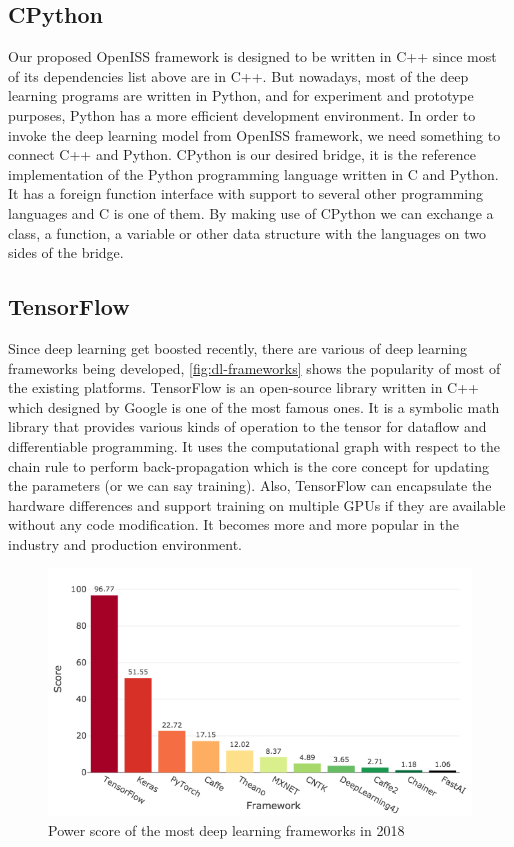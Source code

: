 \subsection{CPython}
\label{sec:related_work_cpython}

Our proposed OpenISS framework is designed to be written in C++ since most of
its dependencies list above are in C++. But nowadays, most of the deep learning
programs are written in Python, and for experiment and prototype purposes,
Python has a more efficient development environment. In order to invoke the
deep learning model from OpenISS framework, we need something to connect C++
and Python. CPython is our desired bridge, it is the reference implementation
of the Python programming language written in C and Python. It has a foreign
function interface with support to several other programming languages and C is
one of them. By making use of CPython we can exchange a class, a function, a
variable or other data structure with the languages on two sides of the bridge.

\subsection{TensorFlow}
\label{sec:related_work_openiss_tf}

Since deep learning get boosted recently, there are various of deep learning
frameworks being developed, \autoref{fig:dl-frameworks} shows the popularity of
most of the existing platforms. TensorFlow \cite{tensorflow2015-whitepaper} is
an open-source library written in C++ which designed by Google is one of the
most famous ones. It is a symbolic math library that provides various kinds of
operation to the tensor for dataflow and differentiable programming. It uses
the computational graph with respect to the chain rule to perform
back-propagation which is the core concept for updating the parameters (or we
can say training). Also, TensorFlow can encapsulate the hardware differences and
support training on multiple GPUs if they are available without any code
modification. It becomes more and more popular in the industry and production
environment.

\begin{figure}
    \includegraphics[width=\linewidth]{figures/dl_framework.png}
    \caption{Power score of the most deep learning frameworks in 2018}
    \label{fig:dl-frameworks}
\end{figure}


